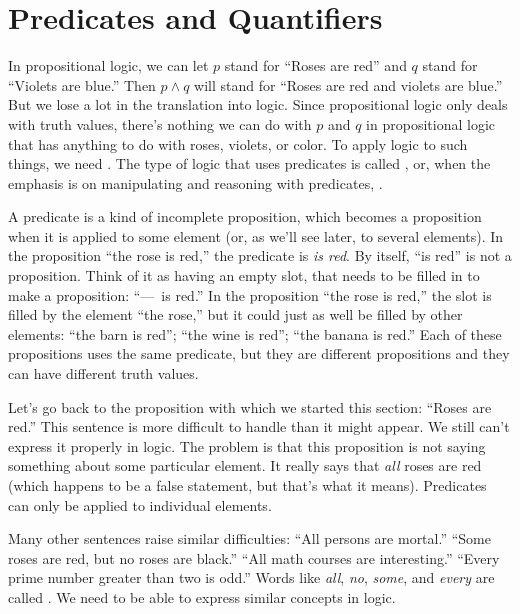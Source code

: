 \section{Predicates and Quantifiers}\label{S-logic-4}

In propositional logic, we can let $p$ stand for ``Roses are red'' and
$q$ stand for ``Violets are blue.''  Then $p\land q$ will stand for
``Roses are red and violets are blue.''  But we lose a lot in the
translation into logic.  Since propositional logic only deals with
truth values, there's nothing we can do with $p$ and $q$ in propositional
logic that has anything to do with roses, violets, or color.
To apply logic to such things, we need .
The type of logic that uses predicates is called , or, when the emphasis is on manipulating and reasoning
with predicates, .

A predicate is a kind of incomplete proposition, which becomes
a proposition when it is applied to some element (or, as we'll see later,
to several elements).  In the proposition ``the rose is red,'' the
predicate is \emph{is red}.  By itself, ``is red'' is not a proposition.
Think of it as having an empty slot, that needs to be filled in
to make a proposition: ``---~is red.''  In the proposition
``the rose is red,'' the slot is filled by the element ``the rose,''
but it could just as well be filled by other elements:
``the barn is red''; ``the wine is red''; ``the banana is red.''
Each of these propositions uses the same predicate, but they are
different propositions and they can have different truth values.

\medbreak

Let's go back to the proposition with which we started this section:
``Roses are red.''  This sentence is more difficult to handle than
it might appear.  We still can't express it properly in logic.
The problem is that this proposition is not saying something about
some particular element.  It really says that \emph{all} roses are red 
(which happens to be a false statement, but that's what it means).
Predicates can only be applied to individual elements.

Many other sentences raise similar difficulties:
``All persons are mortal.''  ``Some roses are red, but no roses are black.''
``All math courses are interesting.''  ``Every prime number greater than two
is odd.''  Words like \emph{all}, \emph{no}, \emph{some}, and \emph{every}
are called .  We need to be able to express similar concepts
in logic.



